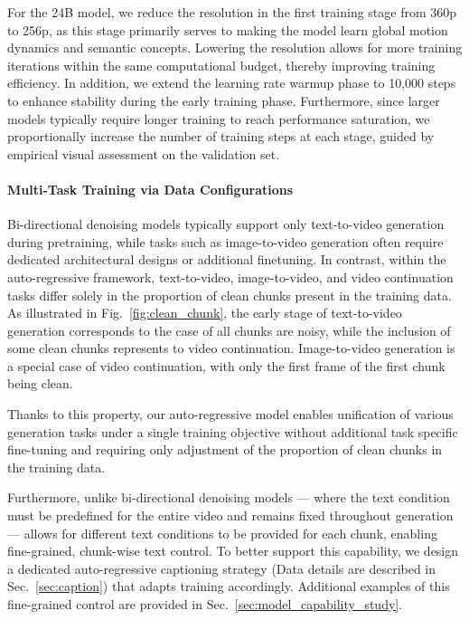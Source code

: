 For the 24B model, we reduce the resolution in the first training stage from 360p to 256p, as this stage primarily serves to making the model learn global motion dynamics and semantic concepts. Lowering the resolution allows for more training iterations within the same computational budget, thereby improving training efficiency. In addition, we extend the learning rate warmup phase to 10,000 steps to enhance stability during the early training phase. Furthermore, since larger models typically require longer training to reach performance saturation, we proportionally increase the number of training steps at each stage, guided by empirical visual assessment on the validation set.


\paragraph{Multi-Task Training via Data Configurations}
Bi-directional denoising models typically support only text-to-video generation during pretraining, while tasks such as image-to-video generation often require dedicated architectural designs or additional finetuning. In contrast, within the auto-regressive framework, text-to-video, image-to-video, and video continuation tasks differ solely in the proportion of clean chunks present in the training data. As illustrated in Fig.~\ref{fig:clean_chunk}, the early stage of text-to-video generation corresponds to the case of all chunks are noisy, while the inclusion of some clean chunks represents to video continuation. Image-to-video generation is a special case of video continuation, with only the first frame of the first chunk being clean.

Thanks to this property, our auto-regressive model enables unification of various generation tasks under a single training objective without additional task specific fine-tuning and requiring only adjustment of the proportion of clean chunks in the training data.

Furthermore, unlike bi-directional denoising models — where the text condition must be predefined for the entire video and remains fixed throughout generation — \magi allows for different text conditions to be provided for each chunk, enabling fine-grained, chunk-wise text control. To better support this capability, we design a dedicated auto-regressive captioning strategy (Data details are described in Sec.~\ref{sec:caption}) that adapts training accordingly. Additional examples of this fine-grained control are provided in Sec.~\ref{sec:model_capability_study}.



